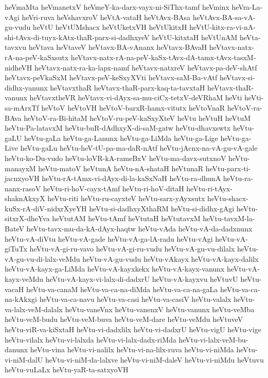 {heVmaMta
heVmanetxV
heVmeY-ka-darx-vayx-ni-SiThx-tamf
heVminx
heVra-La-vAgi
heVri-ruva
heVshavxroV
heVtA-vataH
heVtAvx-BAsa
heVtAvx-BA-sa-vA-gu-vudu
heVtU
heVtUMshacx
heVtUketxVH
heVtUkitxH
heVtU-kitx-ra-vi-nA-shi-tAvx-di-tuyx-kAtx-thaR-parx-si-dadhxyeV
heVtU-kitxtaH
heVtUnAM
heVta-tavxvu
heVtava
heVtaveV
heVtavx-BA-vAnanx
heVtavx-BAvaH
heVtavx-natx-rA-na-peV-kaSxsutx
heVtavx-natx-rA-na-peV-kaSx-tAvx-dA-tamx-tAvx-tasxM-nidheVH
heVtavx-natx-ra-ka-lapx-namf
heVtavx-natxreV
heVtavx-pa-deV-shAtf
heVtavx-peVkaSxM
heVtavx-peV-keSxyXVti
heVtavx-saM-Ba-vAtf
heVtavx-si-didhx-yanunx
heVtavxthaR
heVtavx-thaR-parx-kaq-ta-tavxtaH
heVtavx-thaR-vanunx
heVtavxtheVR
heVtavx-vi-dAyx-sa-mu-ciCx-tetxV-deVRhaM
heVti
heVti-sa-mArxTf
heVtoV
heVtoVH
heVtoV-barxR-hamx-vitutx
heVtoVnaR
heVtoV-ra-BAva
heVtoV-ra-Bi-hitaM
heVtoV-ru-peV-kaSxyXteV
heVtu
heVtuH
heVtuM
heVtu-Pa-latavxM
heVtu-buR-dAdhxyX-di-saM-gatw
heVtu-dhavxswtx
heVtu-gaLU
heVtu-gaLa
heVtu-ga-Lanunx
heVtu-ga-LiMda
heVtu-ga-Lige
heVtu-ga-Live
heVtu-gaLu
heVtu-heV-tU-pa-ma-daR-nAtf
heVtu-jAcnx-na-vA-gu-vA-gale
heVtu-ko-Du-vudo
heVtu-loVR-kA-rameBxV
heVtu-ma-davx-sutxnoV
heVtu-manayxM
heVtu-matoV
heVtunA
heVtu-nA-shataH
heVtunaR
heVtu-parx-ti-jacnxyoVH
heVtu-rA-tAmx-vi-dAyx-di-la-kaSxNaH
heVtu-ra-dhunA
heVtu-ra-nanx-rasoV
heVtu-ri-hoV-cayx-tAmf
heVtu-ri-hoV-ditaH
heVtu-ri-tAyx-shaknAkxyX
heVtu-riti
heVtu-ru-cayxteV
heVtu-sarx-yAyxsutx
heVtu-shacx-kuSx-rA-diV-nidxrXyeYH
heVtu-si-dadhxyXthaRM
heVtu-si-didhx-gAgi
heVtu-sitxrX-dheYva
heVtutAM
heVtu-tAmf
heVtutaH
heVtutavxM
heVtu-tavxM-la-BateV
heVtu-tavx-mu-da-kA-dAyx-haqtw
heVtu-vAda
heVtu-vA-da-dadxnunx
heVtu-vA-diVtu
heVtu-vA-gade
heVtu-vA-ga-lA-radu
heVtu-vAgi
heVtu-vA-giTuTx
heVtu-vA-gi-ru-vavo
heVtu-vA-gi-ru-vudu
heVtu-vA-gu-vu-dilalx
heVtu-vA-gu-vu-di-lalx-veMdu
heVtu-vA-gu-vudu
heVtu-vAkayx
heVtu-vA-kayx-dalilx
heVtu-vA-kayx-ga-LiMda
heVtu-vA-kayxkekx
heVtu-vA-kayx-vanunx
heVtu-vA-kayx-veMdu
heVtu-vA-kayx-vi-lalx-di-dadxrU
heVtu-vA-kayxvu
heVtuvU
heVtu-vacaH
heVtu-va-canaM
heVtu-va-ca-na-diMda
heVtu-va-ca-na-gaLa
heVtu-va-ca-na-kAkxgi
heVtu-va-ca-navu
heVtu-va-casi
heVtu-va-casiV
heVtu-valalx
heVtu-va-lalx-veM-dalalx
heVtu-vaneVnx
heVtu-vanenxV
heVtu-vanunx
heVtu-veMba
heVtu-veM-budu
heVtu-veM-buva
heVtu-veM-dare
heVtu-veMdu
heVtuveV
heVtu-viR-va-kiSxtaH
heVtu-vi-dadxlilx
heVtu-vi-dadxrU
heVtu-vigU
heVtu-vige
heVtu-vilalx
heVtu-vi-lalxda
heVtu-vi-lalx-dadx-riMda
heVtu-vi-lalx-veM-bu-danunx
heVtu-vina
heVtu-vi-nalilx
heVtu-vi-na-lilx-ruva
heVtu-vi-niMda
heVtu-vi-niM-dalU
heVtu-vi-niM-da-lalxve
heVtu-vi-niM-daleV
heVtu-vi-niMdu
heVtuvu
heVtu-vuLaLx
heVtu-yaR-ta-satxyoVH
}
